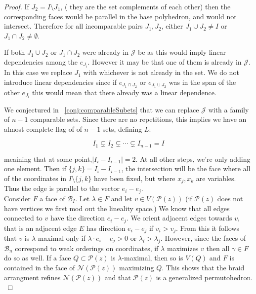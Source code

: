 \documentclass[12pt]{amsart}
\numberwithin{equation}{section}
\newcommand{\bb}{\mathcal{B}}
\newcommand{\J}{\mathcal{J}}
\begin{document}
\begin{proof}
   If $J_2 = I\setminus J_1$, ( they are the set complements of each other) then the corresponding faces would be parallel
in the base polyhedron, and would not intersect.   
Therefore for all incomparable pairs $J_1, J_2$, either $J_1\cup J_2 \neq I$ or $J_1\cap J_2\neq \emptyset$. 

If both    $J_1\cup J_2$ or $J_1\cap J_2$  were already in $\J$ be as this would imply
linear dependencies among the $e_{J_i}$.  However it may be that one of them is already in $\J$. In this case we replace $J_1$ 
with whichever is not already in the set. We do not introduce linear dependencies since if $e_{J_1\cap J_2}$ or   $e_{J_1\cup J_2}$
was in the span of the other $e_{J_i}$ this would mean that there already was a linear dependence.

We conjectured in ~\ref{conj:comparableSubets} that we can replace $\J$ with a family of $n-1$ comparable sets. Since there are
no repetitions, this implies we have  an almost complete flag of 
of $n-1$ sets, defining $L$: 

$$I_1\subsetneq I_2\subsetneq \cdots \subsetneq I_{n-1} =I $$

meaining that at some point,$ |I_i - I_{i-1}| = 2$. 
At all other steps, we're only adding one element.   Then if $\{j,k \} = I_i - I_{i-1}$, the intersection will be the face where 
all of the coordinates in $I\setminus \{j,k\}$ have been fixed, but where $x_j, x_k$ are variables.  Thus the edge is parallel to the vector $e_i-e_j$.  \\ 



 Consider $F$ a face of $\bb_I$.   Let $\lambda\in F$ and  let $v\in V(\mathcal{P}(z))$ (if $\mathcal{P}(z)$ does not have vertices we first mod
out the lineality space.)  We know that all edges connected to $v$
have the direction $e_i-e_j$.  We orient adjacent edges 
towards $v$, that is an adjacent edge $E$ has direction $e_i-e_j$ if $v_i>v_j$.
From this it follows that $v$ is $\lambda$ maximal only if $\lambda\cdot e_i-e_j>0$
or $\lambda_i>\lambda_j$.  However, since the faces of $\bb_n$ 
correspond to weak orderings on coordinates, if $\lambda$ maximizes $v$
then all $\gamma\in F$ do so as well.  If a face
$Q\subset \mathcal{P}(z)$ is $\lambda$-maximal, then so is $V(Q)$
and $F$ is contained in the face of $\mathcal{N}(\mathcal{P}(z))$ maximizing
$Q$.   This shows that the braid arrangment refines $\mathcal{N}(\mathcal{P}(z))$ and that $\mathcal{P}(z)$ is a generalized permutohedron.  \\


\end{proof}
\end{document}
